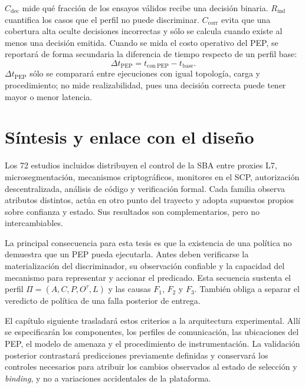 $C_{\mathrm{dec}}$ mide qué fracción de los ensayos válidos recibe una decisión binaria. $R_{\mathrm{ind}}$ cuantifica los casos que el perfil no puede discriminar. $C_{\mathrm{corr}}$ evita que una cobertura alta oculte decisiones incorrectas y sólo se calcula cuando existe al menos una decisión emitida. Cuando se mida el costo operativo del PEP, se reportará de forma secundaria la diferencia de tiempo respecto de un perfil base:
\begin{equation}
    \Delta t_{\mathrm{PEP}} = t_{\mathrm{con\ PEP}} - t_{\mathrm{base}}.
    \label{eq:sobrecarga-pep}
\end{equation}
%
$\Delta t_{\mathrm{PEP}}$ sólo se comparará entre ejecuciones con igual topología, carga y procedimiento; no mide realizabilidad, pues una decisión correcta puede tener mayor o menor latencia.

\section{Síntesis y enlace con el diseño}
\label{sec:cierre-cap2}

Los 72 estudios incluidos distribuyen el control de la SBA entre proxies L7, microsegmentación, mecanismos criptográficos, monitores en el SCP, autorización descentralizada, análisis de código y verificación formal. Cada familia observa atributos distintos, actúa en otro punto del trayecto y adopta supuestos propios sobre confianza y estado. Sus resultados son complementarios, pero no intercambiables.

La principal consecuencia para esta tesis es que la existencia de una política no demuestra que un PEP pueda ejecutarla. Antes deben verificarse la materialización del discriminador, su observación confiable y la capacidad del mecanismo para representar y accionar el predicado. Esta secuencia sustenta el perfil $\Pi=(A,C,P,O^{\tau},L)$ y las causas $F_1$, $F_2$ y $F_3$. También obliga a separar el veredicto de política de una falla posterior de entrega.

El capítulo siguiente trasladará estos criterios a la arquitectura experimental. Allí se especificarán los componentes, los perfiles de comunicación, las ubicaciones del PEP, el modelo de amenaza y el procedimiento de instrumentación. La validación posterior contrastará predicciones previamente definidas y conservará los controles necesarios para atribuir los cambios observados al estado de selección y \textit{binding}, y no a variaciones accidentales de la plataforma.
